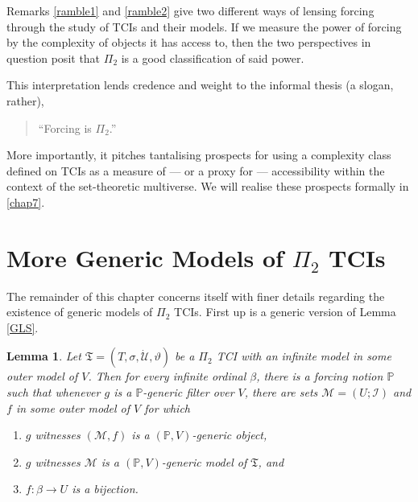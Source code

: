 \documentclass[12pt, twoside]{memoir}
\numberwithin{equation}{section}
\newtheorem{lem}[thm]{Lemma}
\theoremstyle{definition}
\theoremstyle{remark}
\theoremstyle{definition}
\theoremstyle{definition}
\theoremstyle{definition}
\theoremstyle{remark}
\begin{document}
Remarks \ref{ramble1} and \ref{ramble2} give two different ways of lensing forcing through the study of TCIs and their models. If we measure the power of forcing by the complexity of objects it has access to, then the two perspectives in question posit that $\Pi_2$ is a good classification of said power.  

This interpretation lends credence and weight to the informal thesis (a slogan, rather), 
\begin{quote}
    \centering
    ``Forcing is $\Pi_2$.''
\end{quote}
More importantly, it pitches tantalising prospects for using a complexity class defined on TCIs as a measure of --- or a proxy for --- accessibility within the context of the set-theoretic multiverse. We will realise these prospects formally in \ref{chap7}.

\section{More Generic Models of \texorpdfstring{$\Pi_2$}{} TCIs}\label{sect4.3}

The remainder of this chapter concerns itself with finer details regarding the existence of generic models of $\Pi_2$ TCIs. First up is a generic version of Lemma \ref{GLS}.

\begin{lem}\label{genericls}
Let $\mathfrak{T} = (T, \sigma, \dot{\mathcal{U}}, \vartheta)$ be a $\Pi_2$ TCI with an infinite model in some outer model of $V$. Then for every infinite ordinal $\beta$, there is a forcing notion $\mathbb{P}$ such that whenever $g$ is a $\mathbb{P}$-generic filter over $V$, there are sets $\mathcal{M} = (U; \mathcal{I})$ and $f$ in some outer model of $V$ for which  
\begin{enumerate}[label=(\alph*)]
    \item\label{ggls0} $g$ witnesses $(\mathcal{M}, f)$ is a $(\mathbb{P}, V)$-generic object, 
    \item\label{gglsa} $g$ witnesses $\mathcal{M}$ is a $(\mathbb{P}, V)$-generic model of $\mathfrak{T}$, and
    \item\label{gglsb} $f : \beta \longrightarrow U$ is a bijection.
\end{enumerate}
\end{lem}
\end{document}
